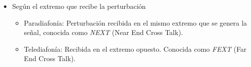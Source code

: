 \documentclass[10pt,portrait, twocolumn]{article}
\begin{document}
\begin{landscape}
\begin{multicols}{3}
\begin{itemize}
\begin{itemize}
\begin{itemize}
						\end{itemize}
					\item Según el extremo que recibe la perturbación
					
						\begin{itemize}
							\item Paradiafonía: Perturbación recibida en el mismo extremo que se genera la señal, conocida como \textit{NEXT} (Near End Cross Talk).
							
%		
%	
							
							\item Telediafonía: Recibida en el extremo opuesto. Conocida como \textit{FEXT} (Far End Cross Talk).
							
%	
%	
				\end{itemize}
		\end{itemize}
\end{itemize}


\end{multicols}
\end{landscape}
\end{document}
